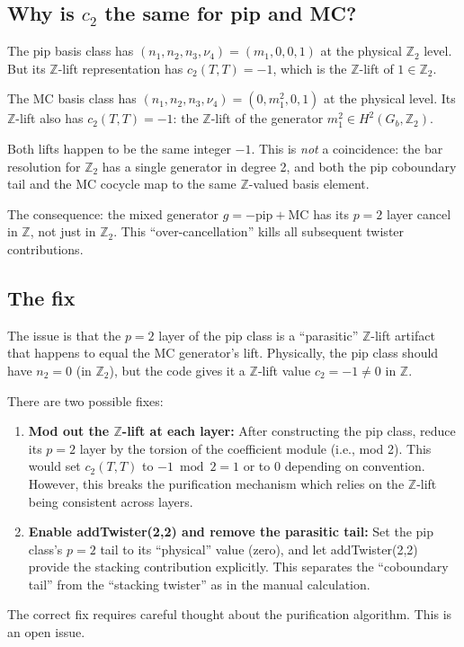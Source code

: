 \documentclass{SciPost}
\begin{document}
\subsection{Why is $c_2$ the same for pip and MC?}

The pip basis class has $(n_1, n_2, n_3, \nu_4) = (m_1, 0, 0, 1)$ at the physical $\mathbb{Z}_2$ level.
But its $\mathbb{Z}$-lift representation has $c_2(T,T) = -1$, which is the $\mathbb{Z}$-lift of $1 \in \mathbb{Z}_2$.

The MC basis class has $(n_1, n_2, n_3, \nu_4) = (0, m_1^2, 0, 1)$ at the physical level.
Its $\mathbb{Z}$-lift also has $c_2(T,T) = -1$: the $\mathbb{Z}$-lift of the generator $m_1^2 \in H^2(G_b, \mathbb{Z}_2)$.

Both lifts happen to be the same integer $-1$.
This is \emph{not} a coincidence: the bar resolution for $\mathbb{Z}_2$ has a single generator in degree 2, and both the pip coboundary tail and the MC cocycle map to the same $\mathbb{Z}$-valued basis element.

The consequence: the mixed generator $g = -\text{pip} + \text{MC}$ has its $p=2$ layer cancel in $\mathbb{Z}$, not just in $\mathbb{Z}_2$.
This ``over-cancellation'' kills all subsequent twister contributions.

\subsection{The fix}

The issue is that the $p=2$ layer of the pip class is a ``parasitic'' $\mathbb{Z}$-lift artifact that happens to equal the MC generator's lift.
Physically, the pip class should have $n_2 = 0$ (in $\mathbb{Z}_2$), but the code gives it a $\mathbb{Z}$-lift value $c_2 = -1 \neq 0$ in $\mathbb{Z}$.

There are two possible fixes:
\begin{enumerate}
\item \textbf{Mod out the $\mathbb{Z}$-lift at each layer:}
After constructing the pip class, reduce its $p=2$ layer by the torsion of the coefficient module (i.e., mod 2).
This would set $c_2(T,T)$ to $-1 \bmod 2 = 1$ or to $0$ depending on convention.
However, this breaks the purification mechanism which relies on the $\mathbb{Z}$-lift being consistent across layers.
\item \textbf{Enable addTwister(2,2) and remove the parasitic tail:}
Set the pip class's $p=2$ tail to its ``physical'' value (zero), and let addTwister(2,2) provide the stacking contribution explicitly.
This separates the ``coboundary tail'' from the ``stacking twister'' as in the manual calculation.
\end{enumerate}
The correct fix requires careful thought about the purification algorithm.
This is an open issue.





\end{document}
